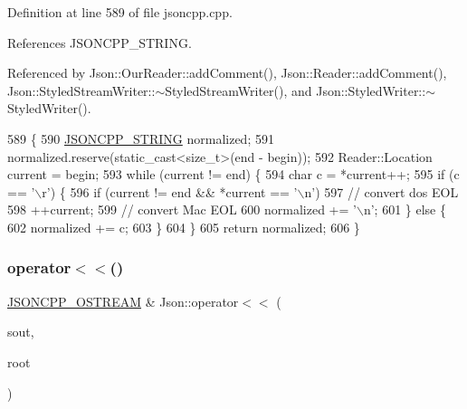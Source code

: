 Definition at line 589 of file jsoncpp.\+cpp.



References J\+S\+O\+N\+C\+P\+P\+\_\+\+S\+T\+R\+I\+NG.



Referenced by Json\+::\+Our\+Reader\+::add\+Comment(), Json\+::\+Reader\+::add\+Comment(), Json\+::\+Styled\+Stream\+Writer\+::$\sim$\+Styled\+Stream\+Writer(), and Json\+::\+Styled\+Writer\+::$\sim$\+Styled\+Writer().


\begin{DoxyCode}
589                                                                              \{
590   \hyperlink{json_8h_a1e723f95759de062585bc4a8fd3fa4be}{JSONCPP\_STRING} normalized;
591   normalized.reserve(static\_cast<size\_t>(end - begin));
592   Reader::Location current = begin;
593   \textcolor{keywordflow}{while} (current != end) \{
594     \textcolor{keywordtype}{char} c = *current++;
595     \textcolor{keywordflow}{if} (c == \textcolor{charliteral}{'\(\backslash\)r'}) \{
596       \textcolor{keywordflow}{if} (current != end && *current == \textcolor{charliteral}{'\(\backslash\)n'})
597          \textcolor{comment}{// convert dos EOL}
598          ++current;
599       \textcolor{comment}{// convert Mac EOL}
600       normalized += \textcolor{charliteral}{'\(\backslash\)n'};
601     \} \textcolor{keywordflow}{else} \{
602       normalized += c;
603     \}
604   \}
605   \textcolor{keywordflow}{return} normalized;
606 \}
\end{DoxyCode}
\mbox{\label{namespace_json_a975d1dbca8aa7a06f38d373edcb9081c}} 
\subsubsection{\texorpdfstring{operator$<$$<$()}{operator<<()}}
{\footnotesize\ttfamily \hyperlink{json_8h_a37a25be5fca174927780caeb280094ce}{J\+S\+O\+N\+C\+P\+P\+\_\+\+O\+S\+T\+R\+E\+AM} \& Json\+::operator$<$$<$ (\begin{DoxyParamCaption}\item[{\hyperlink{json_8h_a37a25be5fca174927780caeb280094ce}{J\+S\+O\+N\+C\+P\+P\+\_\+\+O\+S\+T\+R\+E\+AM} \&}]{sout,  }\item[{const \hyperlink{class_json_1_1_value}{Value} \&}]{root }\end{DoxyParamCaption})}



